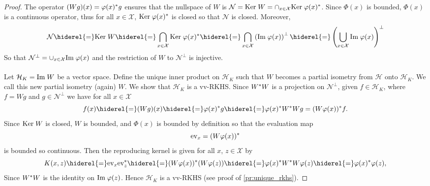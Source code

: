 \begin{proof}
    The operator $(Wg)(x)=\Phi(x)^\adjoint g$ ensures that the nullspace of $W$
    is $\mathcal{N}=\Ker W=\cap_{x\in\mathcal{X}}\Ker \Phi(x)^\adjoint$. Since
    $\Phi(x)$ is bounded, $\Phi(x)$ is a continuous operator, thus for all
    $x\in\mathcal{X}$, $\Ker \Phi(x)^\adjoint$ is closed so that $\mathcal{N}$
    is closed. Moreover,
    \begin{dmath*}
        \mathcal{N}\hiderel{=}\Ker W\hiderel{=}\bigcap_{x\in\mathcal{X}}\Ker
        \Phi(x)^\adjoint\hiderel{=}\bigcap_{x\in\mathcal{X}}\left(\Ima
        \Phi(x)\right)^{\perp}\hiderel{=}\left(\bigcup_{x\in\mathcal{X}}\Ima
        \Phi(x)\right)^{\perp}
    \end{dmath*}
    So that $\mathcal{N}^\perp=\cup_{x\in\mathcal{X}}\Ima \Phi(x)$ and the
    restriction of $W$ to $\mathcal{N}^{\perp}$ is injective.
    \paragraph{}
    Let $\mathcal{H}_K=\text{Im}\; W$ be a vector space. Define the unique inner
    product on $\mathcal{H}_K$ such that $W$ becomes a partial isometry from
    $\mathcal{H}$ onto $\mathcal{H}_K$. We call this new partial isometry
    (again) $W$. We show that $\mathcal{H}_K$ is a \acl{vv-RKHS}. Since
    $W^* W$ is a projection on $\mathcal{N}^{\perp}$, given
    $f\in\mathcal{H}_K$, where $f=Wg$ and $g\in\mathcal{N}^{\perp}$ we have for
    all $x\in\mathcal{X}$
    \begin{dmath*}
        f(x) \hiderel{=} (Wg)(x)\hiderel{=}\Phi(x)^\adjoint
        g\hiderel{=}\Phi(x)^\adjoint W^\adjoint Wg=(W\Phi(x))^\adjoint f.
    \end{dmath*}
    Since $\text{Ker}\; W$ is closed, $W$ is bounded, and $\Phi(x)$ is bounded by
    definition so that the evaluation map
    \begin{dmath*}
        \text{ev}_x=(W\Phi(x))^\adjoint
    \end{dmath*}
    is bounded so continuous. Then the reproducing kernel is given for all $x$,
    $z\in\mathcal{X}$ by
    \begin{dmath*}
        K(x,z)\hiderel{=}\text{ev}_x\text{ev}_z^\adjoint
        \hiderel{=} (W\Phi(x))^\adjoint(W\Phi(z))
        \hiderel{=}\Phi(x)^\adjoint W^\adjoint W\Phi(z)
        \hiderel{=}\Phi(x)^\adjoint\Phi(z),
    \end{dmath*}
    Since $W^* W$ is the identity on $\Ima \Phi(z)$. Hence
    $\mathcal{H}_K$ is a \ac{vv-RKHS} (see proof of \cref{pr:unique_rkhs}).
\end{proof}
